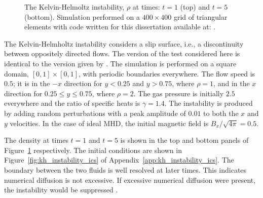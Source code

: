 \begin{figure}[htbp]
\begin{center}
\begin{tabular}{c}
\end{tabular}
\caption{The Kelvin-Helmoltz instability, $\rho$ at times: $t=1$ (top) and $t=5$ (bottom).  Simulation performed on a $400 \times 400$ grid of triangular elements with code written for this dissertation available at: \protect\gitrepo.}
\end{center} 
\label{fig:kh_instability}
\figSpace
\end{figure}

The Kelvin-Helmholtz instability \citep{hydro_stability} considers a slip surface, i.e., a discontinuity between oppositely directed flows.  The version of the test considered here is identical to the version given by \citet{url:athena}.  The simulation is performed on a square domain, $[0,1] \times [0,1]$, with periodic boundaries everywhere.  The flow speed is $0.5$; it is in the $-x$ direction for $ y < 0.25$ and $y > 0.75$, where $\rho = 1$, and in the $x$ direction for $0.25 \le y \le 0.75$, where $\rho = 2$.  The gas pressure is initially $2.5$ everywhere and the ratio of specific heats is $\gamma = 1.4$.  The instability is produced by adding random perturbations with a peak amplitude of $0.01$ to both the $x$ and $y$ velocities.  In the case of ideal MHD, the initial magnetic field is $B_x/\sqrt{4\pi} = 0.5$.

The density at times $t=1$ and $t=5$ is shown in the top and bottom panels of Figure~\ref{fig:kh_instability} respectively.  The initial conditions are shown in Figure~\ref{fig:kh_instability_ics} of Appendix~\ref{app:kh_instability_ics}.  The boundary between the two fluids is well resolved at later times.  This indicates numerical diffusion is not excessive.  If excessive numerical diffusion were present, the instability would be suppressed \citep{url:athena}. 


